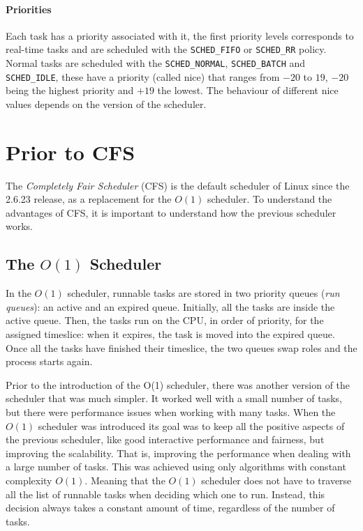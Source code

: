 \paragraph{Priorities} %
Each task has a priority associated with it, the first priority levels
corresponds to real-time tasks and are scheduled with the
\verb|SCHED_FIFO| or \verb|SCHED_RR| policy. Normal tasks are
scheduled with the \verb|SCHED_NORMAL|, \verb|SCHED_BATCH| and
\verb|SCHED_IDLE|, these have a priority (called nice) that ranges
from $-20$ to $19$, $-20$ being the highest priority and $+19$ the
lowest. The behaviour of different nice values depends on the version
of the scheduler.


\label{sec:cfs}
\section{Prior to CFS}
The \textit{Completely Fair Scheduler} (CFS) is the default scheduler of Linux since the 2.6.23 release, as a replacement for the $O(1)$ scheduler. To understand the advantages of CFS, it is important to understand how the previous scheduler works.

\subsection{The $O(1)$ Scheduler}
In the $O(1)$ scheduler, runnable tasks are stored in two priority queues (\textit{run queues}): an active and an expired queue. Initially, all the tasks are inside the active queue. Then, the tasks run on the CPU, in order of priority, for the assigned timeslice: when it expires, the task is moved into the expired queue. Once all the tasks have finished their timeslice, the two queues swap roles and the process starts again.

Prior to the introduction of the O(1) scheduler, there was another version of the scheduler that was much simpler. It worked well with a small number of tasks, but there were performance issues when working with many tasks. When the $O(1)$ scheduler was introduced its goal was to keep all the positive aspects of the previous scheduler, like good interactive performance and fairness, but improving the scalability. That is, improving the performance when dealing with a large number of tasks.
This was achieved using only algorithms with constant complexity $O(1)$. Meaning that the $O(1)$ scheduler does not have to traverse all the list of runnable tasks when deciding which one to run. Instead, this decision always takes a constant amount of time, regardless of the number of tasks.

